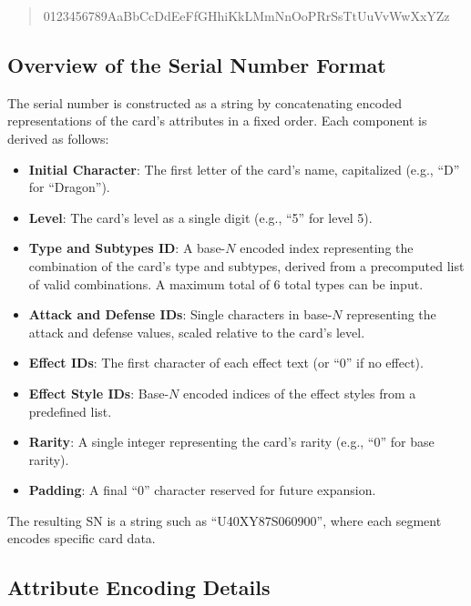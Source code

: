 \begin{quotation}
	0123456789AaBbCcDdEeFfGHhiKkLMmNnOoPRrSsTtUuVvWwXxYZz
\end{quotation}

\subsection{Overview of the Serial Number Format}
The serial number is constructed as a string by concatenating encoded representations of the card's attributes in a fixed order. Each component is derived as follows:
\begin{itemize}
	\item \textbf{Initial Character}: The first letter of the card's name, capitalized (e.g., ``D'' for ``Dragon'').
	\item \textbf{Level}: The card's level as a single digit (e.g., ``5'' for level 5).
	\item \textbf{Type and Subtypes ID}: A base-$N$ encoded index representing the combination of the card's type and subtypes, derived from a precomputed list of valid combinations. A maximum total of 6 total types can be input.
	\item \textbf{Attack and Defense IDs}: Single characters in base-$N$ representing the attack and defense values, scaled relative to the card's level.
	\item \textbf{Effect IDs}: The first character of each effect text (or ``0'' if no effect).
	\item \textbf{Effect Style IDs}: Base-$N$ encoded indices of the effect styles from a predefined list.
	\item \textbf{Rarity}: A single integer representing the card's rarity (e.g., ``0'' for base rarity).
	\item \textbf{Padding}: A final ``0'' character reserved for future expansion.
\end{itemize}
The resulting SN is a string such as ``U40XY87S060900'', where each segment encodes specific card data.

\subsection{Attribute Encoding Details}
